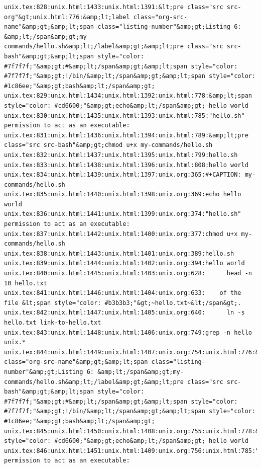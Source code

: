 \documentclass[11pt]{article}
\begin{document}
\begin{verbatim}
unix.tex:828:unix.html:1433:unix.html:1391:&lt;pre class="src src-org"&gt;unix.html:776:&amp;lt;label class="org-src-name"&amp;gt;&amp;lt;span class="listing-number"&amp;gt;Listing 6: &amp;lt;/span&amp;gt;my-commands/hello.sh&amp;lt;/label&amp;gt;&amp;lt;pre class="src src-bash"&amp;gt;&amp;lt;span style="color: #7f7f7f;"&amp;gt;#&amp;lt;/span&amp;gt;&amp;lt;span style="color: #7f7f7f;"&amp;gt;!/bin/&amp;lt;/span&amp;gt;&amp;lt;span style="color: #1c86ee;"&amp;gt;bash&amp;lt;/span&amp;gt;
unix.tex:829:unix.html:1434:unix.html:1392:unix.html:778:&amp;lt;span style="color: #cd6600;"&amp;gt;echo&amp;lt;/span&amp;gt; hello world
unix.tex:830:unix.html:1435:unix.html:1393:unix.html:785:"hello.sh" permission to act as an executable:
unix.tex:831:unix.html:1436:unix.html:1394:unix.html:789:&amp;lt;pre class="src src-bash"&amp;gt;chmod u+x my-commands/hello.sh
unix.tex:832:unix.html:1437:unix.html:1395:unix.html:799:hello.sh
unix.tex:833:unix.html:1438:unix.html:1396:unix.html:808:hello world
unix.tex:834:unix.html:1439:unix.html:1397:unix.org:365:#+CAPTION: my-commands/hello.sh
unix.tex:835:unix.html:1440:unix.html:1398:unix.org:369:echo hello world
unix.tex:836:unix.html:1441:unix.html:1399:unix.org:374:"hello.sh" permission to act as an executable:
unix.tex:837:unix.html:1442:unix.html:1400:unix.org:377:chmod u+x my-commands/hello.sh
unix.tex:838:unix.html:1443:unix.html:1401:unix.org:389:hello.sh
unix.tex:839:unix.html:1444:unix.html:1402:unix.org:394:hello world
unix.tex:840:unix.html:1445:unix.html:1403:unix.org:628:      head -n 10 hello.txt
unix.tex:841:unix.html:1446:unix.html:1404:unix.org:633:    of the file &lt;span style="color: #b3b3b3;"&gt;~hello.txt~&lt;/span&gt;.
unix.tex:842:unix.html:1447:unix.html:1405:unix.org:640:      ln -s hello.txt link-to-hello.txt
unix.tex:843:unix.html:1448:unix.html:1406:unix.org:749:grep -n hello unix.*
unix.tex:844:unix.html:1449:unix.html:1407:unix.org:754:unix.html:776:&amp;lt;label class="org-src-name"&amp;gt;&amp;lt;span class="listing-number"&amp;gt;Listing 6: &amp;lt;/span&amp;gt;my-commands/hello.sh&amp;lt;/label&amp;gt;&amp;lt;pre class="src src-bash"&amp;gt;&amp;lt;span style="color: #7f7f7f;"&amp;gt;#&amp;lt;/span&amp;gt;&amp;lt;span style="color: #7f7f7f;"&amp;gt;!/bin/&amp;lt;/span&amp;gt;&amp;lt;span style="color: #1c86ee;"&amp;gt;bash&amp;lt;/span&amp;gt;
unix.tex:845:unix.html:1450:unix.html:1408:unix.org:755:unix.html:778:&amp;lt;span style="color: #cd6600;"&amp;gt;echo&amp;lt;/span&amp;gt; hello world
unix.tex:846:unix.html:1451:unix.html:1409:unix.org:756:unix.html:785:"hello.sh" permission to act as an executable:

\end{verbatim}
\end{document}
